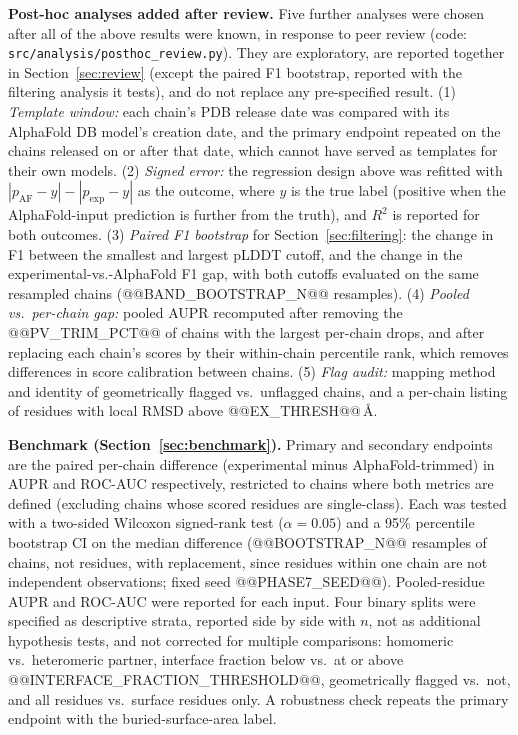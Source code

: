 \documentclass[10pt]{article}
\begin{document}
\textbf{Post-hoc analyses added after review.} Five further analyses were
chosen after all of the above results were known, in response to peer
review (code: \texttt{src/analysis/posthoc\_review.py}). They are
exploratory, are reported together in Section~\ref{sec:review} (except the
paired F1 bootstrap, reported with the filtering analysis it tests), and do
not replace any pre-specified result. (1) \emph{Template window:} each chain's
PDB release date was compared with its AlphaFold DB model's creation date,
and the primary endpoint repeated on the chains released on or after that
date, which cannot have served as templates for their own models. (2)
\emph{Signed error:} the regression design above was refitted with
$|p_{\mathrm{AF}} - y| - |p_{\mathrm{exp}} - y|$ as the outcome, where $y$
is the true label (positive when the AlphaFold-input prediction is further
from the truth), and $R^2$ is reported for both outcomes. (3) \emph{Paired
F1 bootstrap} for Section~\ref{sec:filtering}: the change in F1 between the
smallest and largest pLDDT cutoff, and the change in the
experimental-vs.-AlphaFold F1 gap, with both cutoffs evaluated on the same
resampled chains (@@BAND_BOOTSTRAP_N@@ resamples). (4) \emph{Pooled vs.\
per-chain gap:} pooled AUPR recomputed after removing the
@@PV_TRIM_PCT@@ of chains with the largest per-chain drops, and after
replacing each chain's scores by their within-chain percentile rank, which
removes differences in score calibration between chains. (5) \emph{Flag
audit:} mapping method and identity of geometrically flagged vs.\ unflagged
chains, and a per-chain listing of residues with local RMSD above
@@EX_THRESH@@\,\r{A}.

\textbf{Benchmark (Section~\ref{sec:benchmark}).} Primary and secondary
endpoints are the paired per-chain difference (experimental minus
AlphaFold-trimmed) in AUPR and ROC-AUC respectively, restricted to chains
where both metrics are defined (excluding chains whose scored residues are
single-class). Each was tested with a two-sided Wilcoxon signed-rank test
($\alpha = 0.05$) and a 95\% percentile bootstrap CI on the median difference
(@@BOOTSTRAP_N@@ resamples of chains, not residues, with replacement, since
residues within one chain are not independent observations; fixed seed
@@PHASE7_SEED@@). Pooled-residue AUPR and ROC-AUC were reported for each
input. Four binary splits were specified as descriptive strata, reported
side by side with $n$, not as additional hypothesis tests, and not corrected
for multiple comparisons: homomeric vs.\ heteromeric partner, interface
fraction below vs.\ at or above @@INTERFACE_FRACTION_THRESHOLD@@,
geometrically flagged vs.\ not, and all residues vs.\ surface residues
only. A robustness check repeats the primary endpoint with the
buried-surface-area label.
\end{document}
